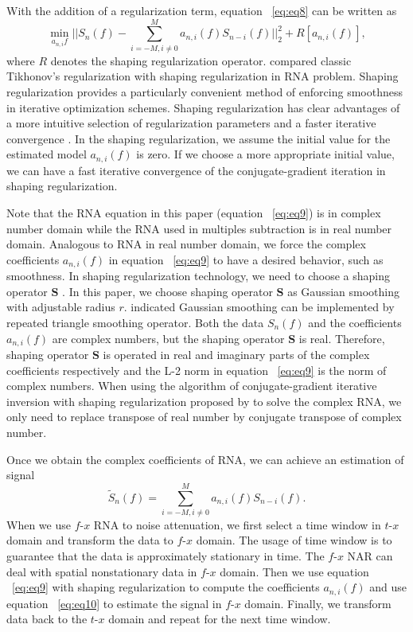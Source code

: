 With the addition of a regularization term, equation ~\ref{eq:eq8} can be written as
      \begin{equation}
          \min_{a_{n,i}{f}}||{{S}_{n}}(f)-\sum\limits_{i=-M,i\ne 0}^{M}{{{a}_{n,i}}(f){{S}_{n-i}}(f)}||_{2}^{2}+R[{{a}_{n,i}}(f)],
        \label{eq:eq9}
      \end{equation} 
where $R$ denotes the shaping regularization operator. \cite{Fomel2009} compared classic 
Tikhonov’s regularization with shaping regularization in RNA problem. 
Shaping regularization \cite{Fomel2007} provides a particularly convenient method of 
enforcing smoothness in iterative optimization schemes. Shaping regularization has clear 
advantages of a more intuitive selection of regularization parameters and a faster iterative 
convergence \cite[]{Fomel2009}. In the shaping regularization, we assume the initial 
value for the estimated model ${{a}_{n,i}}(f)$ is zero. If we choose a more appropriate 
initial value, we can have a fast iterative convergence of the conjugate-gradient iteration
in shaping regularization.

Note that the RNA equation in this paper (equation ~\ref{eq:eq9}) is in complex 
number domain while the RNA used in multiples subtraction \cite[]{Fomel2009}
is in real number domain. Analogous to RNA in real number domain, 
we force the complex coefficients ${{a}_{n,i}}(f)$ in equation ~\ref{eq:eq9} 
to have a desired behavior, such as smoothness. In shaping regularization technology, 
we need to choose a shaping operator $\mathbf{S}$ \cite[]{Fomel2007}.
In this paper, we choose shaping operator $\mathbf{S}$ as Gaussian smoothing with adjustable radius $r$. 
\cite{Fomel2007} indicated Gaussian smoothing can be implemented by repeated triangle smoothing operator. 
Both the data ${{S}_{n}}(f)$ and the coefficients ${{a}_{n,i}}(f)$ are complex numbers, but the shaping 
operator $\mathbf{S}$ is real. Therefore, shaping operator $\mathbf{S}$ is operated in real and imaginary 
parts of the complex coefficients respectively and the L-2 norm in equation ~\ref{eq:eq9} is the norm of complex numbers. 
When using the algorithm of conjugate-gradient iterative inversion with shaping regularization proposed by \cite{Fomel2007}
 to solve the complex RNA, we only need to replace transpose of real number by conjugate transpose of complex number.

Once we obtain the complex coefficients of RNA, we can achieve an estimation of signal
      \begin{equation} 
        {{\tilde{S}}_{n}}(f)=\sum\limits_{i=-M,i\ne 0}^{M}{{{a}_{n,i}}(f){{S}_{n-i}}(f)}.
        \label{eq:eq10}
      \end{equation} 
When we use $f$-$x$ RNA to noise attenuation, we first select a time window in $t$-$x$ domain and 
transform the data to $f$-$x$ domain. The usage of time window is to guarantee that the data 
is approximately stationary in time. The $f$-$x$ NAR can deal with spatial nonstationary data 
in $f$-$x$ domain. Then we use equation ~\ref{eq:eq9} with shaping regularization to compute the coefficients
 ${{a}_{n,i}}(f)$ and use equation ~\ref{eq:eq10} to estimate the signal in $f$-$x$ domain. Finally, 
we transform data back to the $t$-$x$ domain and repeat for the next time window.

